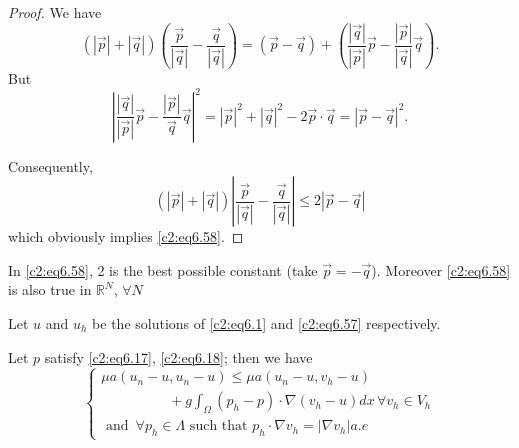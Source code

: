 \begin{proof}
We have
$$
(| \overrightarrow{p}|+ |\overrightarrow{q}|)
\left(\frac{\overrightarrow{p}}{|\overrightarrow{q}|} -
\frac{\overrightarrow{q}}{|\overrightarrow{q}|}\right)= (\overrightarrow{p}
- \overrightarrow{q})
+\left(\frac{|\overrightarrow{q}|}{|\overrightarrow{p}|} \overrightarrow{p}
- \frac{|\overrightarrow{p}|}{|\overrightarrow{q}|}
\overrightarrow{q}\right). 
$$
But 
$$
\left|\frac{ |\overrightarrow{q}|}{|\overrightarrow{p}|} \overrightarrow{p}
- \frac{|\overrightarrow{p}|}{\overrightarrow{q}}
\overrightarrow{q}\right|^2 = |\overrightarrow{p}|^2 +
|\overrightarrow{q}|^2 - 2 \overrightarrow{p}\cdot \overrightarrow{q}
= | \overrightarrow{p}- \overrightarrow{q}|^2. 
$$

Consequently,  
$$
(|\overrightarrow{p}| + |\overrightarrow{q}|)
\left|\frac{\overrightarrow{p}}{|\overrightarrow{q}|}-
\frac{\overrightarrow{q}}{|\overrightarrow{q}|}\right| \leq 2
|\overrightarrow{p}- \overrightarrow{q}| 
$$
which obviously implies \eqref{c2:eq6.58}.
\end{proof}

\begin{remark}\label{c2:rem6.7}%
In \eqref{c2:eq6.58}, 2 is the best possible constant (take
$\overrightarrow{p}= - \overrightarrow{q}$). Moreover \eqref{c2:eq6.58} is also
true in $\mathbb{R}^N$, $\forall N$ 
\end{remark}

\begin{lemma}\label{c2:lem6.2}%
Let $u$ and $u_h$ be the solutions of \eqref{c2:eq6.1} and
\eqref{c2:eq6.57} respectively.  
\end{lemma}
Let $p$ satisfy \eqref{c2:eq6.17}, \eqref{c2:eq6.18}; then we have  
\begin{equation}
\begin{cases}
\mu a (u_n - u, u_n -u) \leq \mu a(u_n - u, v_h -u) \\
\hspace{2cm}+ g \int_\Omega
(p_h - p) \cdot \nabla (v_h - u) dx\, \forall  v_h \in V_h\\ 
\text{ and }\, \forall  p_h \in \Lambda  \text{ such that } p_h
\cdot \nabla v_h = |\nabla v_h| a. e 
\end{cases}
\tag{6.59}\label{c2:eq6.59}
\end{equation}

